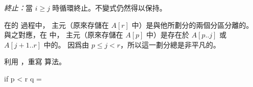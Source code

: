 \emph{終止：}當 $i\ge j$ 時循環終止。不變式仍然得以保持。
\stopANSWER

在 的  過程中，
主元（原來存儲在 $A[r]$ 中）是與他所劃分的兩個分區分離的。
與之對應，在  中，
主元（原來存儲在 $A[p]$ 中）是存在於 $A[p..j]$ 或 $A[j+1..r]$ 中的。
因爲由 $p\le j<r$，所以這一劃分總是非平凡的。
\startigBase[a,continue]
\item 利用 ，重寫  算法。
\stopigBase

\startANSWER
{}
\startCLRSCODE
if p < r
	q = 
\stopCLRSCODE
\stopANSWER
\stopPROBLEM
